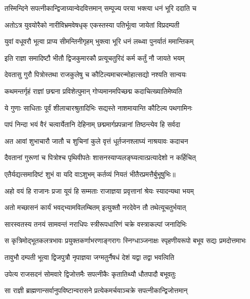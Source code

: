\twolineshloka
{तस्मिन्दिने सपत्नीकान्द्विजाग्र्यान्वेदवित्तमान्}
{सम्पूज्य परया भक्त्या धनं भूरि ददाति च} %

\twolineshloka
{अतोऽत्र युवयोरैको नारीविभ्रमवेषधृक्}
{एकस्तस्या पतिर्भूत्वा जायेतां विप्रदम्पती} %

\twolineshloka
{युवां वधूवरौ भूत्वा प्राप्य सीमन्तिनीगृहम्}
{भुक्त्वा भूरि धनं लब्ध्वा पुनर्यातं ममान्तिकम्} %

\twolineshloka
{इति राज्ञा समादिष्टौ भीतौ द्विजकुमारकौ}
{प्रत्यूचतुरिदं कर्म कर्तुं नौ जायते भयम्} %

\twolineshloka
{देवतासु गुरौ पित्रोस्तथा राजकुलेषु च}
{कौटिल्यमाचरन्मोहात्सद्यो नश्यति सान्वयः} %

\twolineshloka
{कथमन्तर्गृहं राज्ञां छद्मना प्रविशेत्पुमान्}
{गोप्यमानमपिच्छद्म कदाचित्ख्यातिमेष्यति} %

\twolineshloka
{ये गुणाः साधिताः पूर्वं शीलाचारश्रुतादिभिः}
{सद्यस्ते नाशमायान्ति कौटिल्य पथगामिनः} %

\twolineshloka
{पापं निन्दा भयं वैरं चत्वार्येतानि देहिनाम्}
{छद्ममार्गप्रपन्नानां तिष्ठन्त्येव हि सर्वदा} %

\twolineshloka
{अत आवां शुभाचारौ जातौ च शुचिनां कुले}
{वृत्तं धूर्तजनश्लाघ्यं नाश्रयावः कदाचन} %

\twolineshloka
{दैवतानां गुरूणां च पित्रोश्च पृथिवीपतेः}
{शासनस्याप्यलङ्घ्यत्वात्प्रत्यादेशो न कर्हिचित्} %

\twolineshloka
{एतैर्यद्यत्समादिष्टं शुभं वा यदि वाऽशुभम्}
{कर्तव्यं नियतं भीतैरप्रमत्तैर्बुभूषुभिः॥} %

\twolineshloka
{अहो वयं हि राजानः प्रजा यूयं हि सम्मताः}
{राजाज्ञया प्रवृत्तानां श्रेयः स्यादन्यथा भयम्} %

\twolineshloka
{अतो मच्छासनं कार्यं भवद्भ्यामविलम्बितम्}
{इत्युक्तौ नरदेवेन तौ तथेत्यूचतुर्भयात्} %

\twolineshloka
{सारस्वतस्य तनयं सामवन्तं नराधिपः}
{स्त्रीरूपधारिणं चक्रे वस्त्राकल्पां जनादिभिः} %

\fourlineindentedshloka
{स कृत्रिमोद्भूतकलत्रभावः}
{प्रयुक्तकर्णाभरणाङ्गरागः}
{स्निग्धाञ्जनाक्षः स्पृहणीयरूपो}
{बभूव सद्यः प्रमदोत्तमाभः} %

\twolineshloka
{तावुभौ दम्पती भूत्वा द्विजपुत्रौ नृपाज्ञया}
{जग्मतुर्नैषधं देशं यद्वा तद्वा भवत्विति} %

\twolineshloka
{उपेत्य राजसदनं सोमवारे द्विजोत्तमैः}
{सपत्नीकैः कृतातिथ्यौ धौतपादौ बभूवतुः} %

\twolineshloka
{सा राज्ञी ब्राह्मणान्सर्वानुपविष्टान्वरासने}
{प्रत्येकमर्चयाञ्चक्रे सपत्नीकान्द्विजोत्तमान्} %

